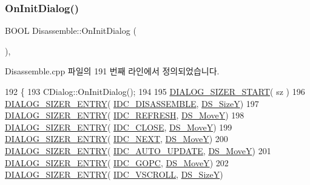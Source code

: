\subsubsection{\texorpdfstring{On\+Init\+Dialog()}{OnInitDialog()}}
{\footnotesize\ttfamily B\+O\+OL Disassemble\+::\+On\+Init\+Dialog (\begin{DoxyParamCaption}{ }\end{DoxyParamCaption})\hspace{0.3cm}{\ttfamily [protected]}, {\ttfamily [virtual]}}



Disassemble.\+cpp 파일의 191 번째 라인에서 정의되었습니다.


\begin{DoxyCode}
192 \{
193   CDialog::OnInitDialog();
194   
195   \mbox{\hyperlink{_resize_dlg_8h_acb9d1d22d9838f6dda8a61cfa132997c}{DIALOG\_SIZER\_START}}( sz )
196     \mbox{\hyperlink{_resize_dlg_8h_a0e9ee7a18c54003893895a009f5d79c8}{DIALOG\_SIZER\_ENTRY}}( \mbox{\hyperlink{resource_8h_a1e77bc2c6285101b4f86fb554e60299c}{IDC\_DISASSEMBLE}}, 
      \mbox{\hyperlink{_resize_dlg_8h_a783821ba6bb984916d55f46cdf90cb2b}{DS\_SizeY}})
197     \mbox{\hyperlink{_resize_dlg_8h_a0e9ee7a18c54003893895a009f5d79c8}{DIALOG\_SIZER\_ENTRY}}( \mbox{\hyperlink{resource_8h_ab2f366ad34063a7be9de1e2249dc705a}{IDC\_REFRESH}}, \mbox{\hyperlink{_resize_dlg_8h_ae5309071be822a4dae5cb33a131f6180}{DS\_MoveY}})
198     \mbox{\hyperlink{_resize_dlg_8h_a0e9ee7a18c54003893895a009f5d79c8}{DIALOG\_SIZER\_ENTRY}}( \mbox{\hyperlink{resource_8h_a27e7224faecfa4040c695a69107088f9}{IDC\_CLOSE}}, \mbox{\hyperlink{_resize_dlg_8h_ae5309071be822a4dae5cb33a131f6180}{DS\_MoveY}})
199     \mbox{\hyperlink{_resize_dlg_8h_a0e9ee7a18c54003893895a009f5d79c8}{DIALOG\_SIZER\_ENTRY}}( \mbox{\hyperlink{resource_8h_a0bef3b291371b0573bb0ba8987e8d6fa}{IDC\_NEXT}},  \mbox{\hyperlink{_resize_dlg_8h_ae5309071be822a4dae5cb33a131f6180}{DS\_MoveY}})
200     \mbox{\hyperlink{_resize_dlg_8h_a0e9ee7a18c54003893895a009f5d79c8}{DIALOG\_SIZER\_ENTRY}}( \mbox{\hyperlink{resource_8h_ad369b05206010ebec1c8a69a1dd1f141}{IDC\_AUTO\_UPDATE}}, 
      \mbox{\hyperlink{_resize_dlg_8h_ae5309071be822a4dae5cb33a131f6180}{DS\_MoveY}})
201     \mbox{\hyperlink{_resize_dlg_8h_a0e9ee7a18c54003893895a009f5d79c8}{DIALOG\_SIZER\_ENTRY}}( \mbox{\hyperlink{resource_8h_a09f50527734f41cb89a3fbd6bfd9b97c}{IDC\_GOPC}}, \mbox{\hyperlink{_resize_dlg_8h_ae5309071be822a4dae5cb33a131f6180}{DS\_MoveY}})
202     \mbox{\hyperlink{_resize_dlg_8h_a0e9ee7a18c54003893895a009f5d79c8}{DIALOG\_SIZER\_ENTRY}}( \mbox{\hyperlink{resource_8h_a420d68e24dfd23b92f4c35464790687e}{IDC\_VSCROLL}}, \mbox{\hyperlink{_resize_dlg_8h_a783821ba6bb984916d55f46cdf90cb2b}{DS\_SizeY}})

\end{DoxyCode}

